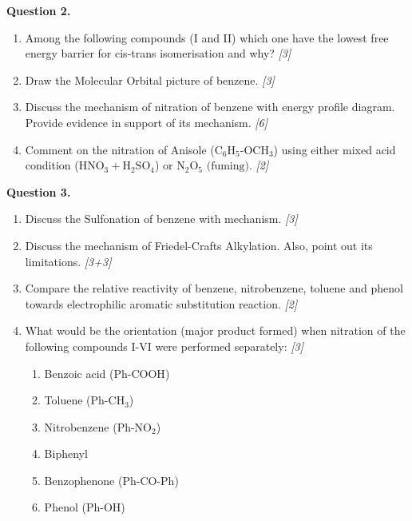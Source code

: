 \documentclass[11pt,a4paper]{article}
\newcommand{\pts}[1]{\hfill \textit{[#1]}}
\begin{document}
\bigskip

\noindent \textbf{Question 2.}
\begin{enumerate}[label=(\alph*)]
  \item Among the following compounds (I and II) which one have the lowest free energy barrier for cis-trans isomerisation and why? \pts{3}
  \item Draw the Molecular Orbital picture of benzene. \pts{3}
  \item Discuss the mechanism of nitration of benzene with energy profile diagram. Provide evidence in support of its mechanism. \pts{6}
  \item Comment on the nitration of Anisole ($\text{C}_6\text{H}_5\text{-OCH}_3$) using either mixed acid condition ($\text{HNO}_3+\text{H}_2\text{SO}_4$) or $\text{N}_2\text{O}_5\text{ (fuming)}$. \pts{2}
\end{enumerate}

\bigskip

\noindent \textbf{Question 3.}
\begin{enumerate}[label=(\alph*)]
  \item Discuss the Sulfonation of benzene with mechanism. \pts{3}
  \item Discuss the mechanism of Friedel-Crafts Alkylation. Also, point out its limitations. \pts{3+3}
  \item Compare the relative reactivity of benzene, nitrobenzene, toluene and phenol towards electrophilic aromatic substitution reaction. \pts{2}
  \item What would be the orientation (major product formed) when nitration of the following compounds I-VI were performed separately: \pts{3}
  \begin{enumerate}[label=(\roman*)]
    \item Benzoic acid ($\text{Ph-COOH}$)
    \item Toluene ($\text{Ph-CH}_3$)
    \item Nitrobenzene ($\text{Ph-NO}_2$)
    \item Biphenyl
    \item Benzophenone ($\text{Ph-CO-Ph}$)
    \item Phenol ($\text{Ph-OH}$)
  \end{enumerate}
\end{enumerate}

\bigskip
\end{document}
